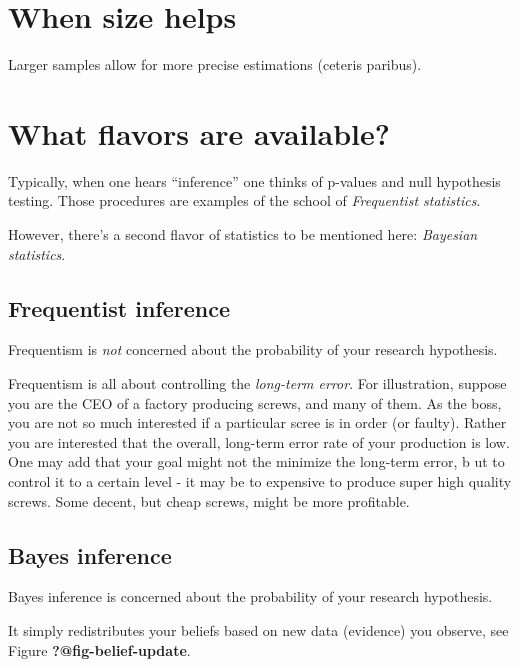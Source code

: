 \documentclass[
  letterpaper,
  DIV=11,
  numbers=noendperiod]{scrreprt}
\theoremstyle{definition}
\theoremstyle{definition}
\theoremstyle{remark}
\begin{document}
\hypertarget{when-size-helps}{%
\section{When size helps}\label{when-size-helps}}

Larger samples allow for more precise estimations (ceteris paribus).

\hypertarget{what-flavors-are-available}{%
\section{What flavors are available?}\label{what-flavors-are-available}}

Typically, when one hears ``inference'' one thinks of p-values and null
hypothesis testing. Those procedures are examples of the school of
\emph{Frequentist statistics}.

However, there's a second flavor of statistics to be mentioned here:
\emph{Bayesian statistics}.

\hypertarget{frequentist-inference}{%
\subsection{Frequentist inference}\label{frequentist-inference}}

Frequentism is \emph{not} concerned about the probability of your
research hypothesis.

Frequentism is all about controlling the \emph{long-term error}. For
illustration, suppose you are the CEO of a factory producing screws, and
many of them. As the boss, you are not so much interested if a
particular scree is in order (or faulty). Rather you are interested that
the overall, long-term error rate of your production is low. One may add
that your goal might not the minimize the long-term error, b ut to
control it to a certain level - it may be to expensive to produce super
high quality screws. Some decent, but cheap screws, might be more
profitable.

\hypertarget{bayes-inference}{%
\subsection{Bayes inference}\label{bayes-inference}}

Bayes inference is concerned about the probability of your research
hypothesis.

It simply redistributes your beliefs based on new data (evidence) you
observe, see Figure \textbf{?@fig-belief-update}.
\end{document}
